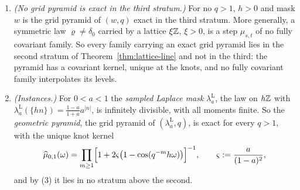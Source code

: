 \begin{proposition}
\begin{enumerate}
$M \to \infty$. The measure $\varpi_1$ is carried by the union of the sets $q^{-m}h\ZZ_{>0}$,
$m \ge 1$, and by no lattice $\xi\ZZ$. When $w$ is infinitely divisible and
$\int\log_+v\;\varpi_w(dv) = \infty$, the partial products
have no limit that is a characteristic function, and they tend to $0$ at almost every $\omega$,
though not in general at every $\omega \ne 0$ (at $q = 2$, by
Proposition~\ref{prop:ladder-not-every-frequency}): there is no kernel. The families carrying the ladder
are not unique. One of them is the \emph{uniform coupling}, with $a(t) = 0$ and
$\varpi_t = \varpi_1 + (\log_qt)\,\varpi_w$ for $t \in [1,q]$, each atom of the mask switched on
linearly in $\log t$ across the octave.
\item \emph{(No grid pyramid is exact in the third stratum.)} For no $q > 1$, $h > 0$ and mask $w$ is the
grid pyramid of $(w, q)$ exact in the third stratum. More generally, a symmetric law $\varrho \ne \delta_0$
carried by a lattice $\xi\ZZ$, $\xi > 0$, is a step $\mu_{s,t}$ of no fully covariant family. So
every family carrying an exact grid pyramid lies in the second stratum of
Theorem~\ref{thm:lattice-line} and not in the third: the pyramid has a covariant kernel, unique at
the knots, and no fully covariant family interpolates its levels.
\item \emph{(Instances.)} For $0 < a < 1$ the \emph{sampled Laplace mask}
$\lambda^{\mathrm{L}}_a$, the law on $h\mathbb{Z}$ with $\lambda^{\mathrm{L}}_a(\{hn\}) =
\tfrac{1-a}{1+a}a^{|n|}$, is infinitely divisible, with all moments finite. So the
\emph{geometric pyramid}, the grid pyramid of $(\lambda^{\mathrm{L}}_a, q)$, is exact for
every $q > 1$, with the unique knot kernel
\begin{equation}
\label{eq:geometric-pyramid-knot-kernel}
  \widehat\mu_{0,1}(\omega) = \prod_{m \ge 1}\Bigl[1 + 2\varsigma\bigl(1 - \cos(q^{-m}h\omega)\bigr)\Bigr]^{-1},
  \qquad \varsigma := \frac{a}{(1-a)^2},
\end{equation}
and by (3) it lies in no stratum above the second.

\end{enumerate}
\end{proposition}
